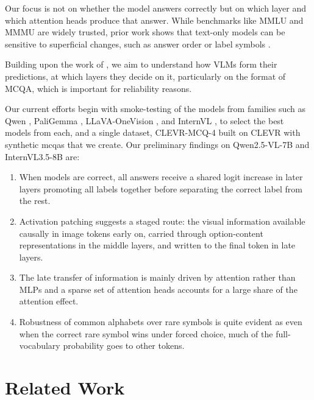 \documentclass[11pt]{article}
\begin{document}
Our focus is not on whether the model answers correctly but on which layer and which attention heads produce that answer. While benchmarks like MMLU and MMMU are widely trusted, prior work shows that text-only models can be sensitive to superficial changes, such as answer order or label symbols \cite{pezeshkpour2024large,alzahrani2024when,khatun2024study,zheng2024large}.

Building upon the work of \cite{wiegreffe2025answerassembleaceunderstanding}, we aim to understand how VLMs form their predictions, at which layers they decide on it, particularly on the format of MCQA, which is important for reliability reasons.

Our current efforts begin with smoke-testing of the models from families such as Qwen \cite{bai2025qwen3vltechnicalreport}, PaliGemma \cite{beyer2024paligemmaversatile3bvlm}, LLaVA-OneVision \cite{li2024llavaonevisioneasyvisualtask}, and InternVL \cite{wang2025internvl35advancingopensourcemultimodal}, to select the best models from each, and a single dataset, CLEVR-MCQ-4 built on CLEVR \cite{johnson2016clevrdiagnosticdatasetcompositional} with synthetic mcqas that we create. Our preliminary findings on Qwen2.5-VL-7B \citep{bai2025qwen25vltechnicalreport} and InternVL3.5-8B \cite{wang2025internvl35advancingopensourcemultimodal} are:

\begin{enumerate}
        \item When models are correct, all answers receive a shared logit increase in later layers promoting all labels together before separating the correct label from the rest.
        \item Activation patching suggests a staged route: the visual information available causally in image tokens early on, carried through option-content representations in the middle layers, and written to the final token in late layers.
        \item The late transfer of information is mainly driven by attention rather than MLPs and a sparse set of attention heads accounts for a large share of the attention effect.
        \item Robustness of common alphabets over rare symbols is quite evident as even when the correct rare symbol wins under forced choice, much of the full-vocabulary probability goes to other tokens.
\end{enumerate}

\section{Related Work}
\end{document}
